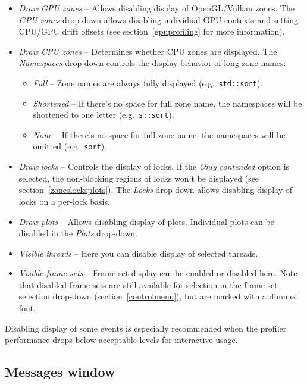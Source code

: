 \documentclass[hidelinks,titlepage,a4paper]{article}
\begin{document}
\begin{itemize}
\item \emph{\faEye{} Draw GPU zones} -- Allows disabling display of OpenGL/Vulkan zones. The \emph{GPU zones} drop-down allows disabling individual GPU contexts and setting CPU/GPU drift offsets (see section~\ref{gpuprofiling} for more information).
\item \emph{\faMicrochip{} Draw CPU zones} -- Determines whether CPU zones are displayed. The \emph{Namespaces} drop-down controls the display behavior of long zone names:
\begin{itemize}
\item \emph{Full} -- Zone names are always fully displayed (e.g.\ \texttt{std::sort}).
\item \emph{Shortened} -- If there's no space for full zone name, the namespaces will be shortened to one letter (e.g.\ \texttt{s::sort}).
\item \emph{None} -- If there's no space for full zone name, the namespaces will be omitted (e.g.\ \texttt{sort}).
\end{itemize}
\item \emph{\faLock{} Draw locks} -- Controls the display of locks. If the \emph{Only contended} option is selected, the non-blocking regions of locks won't be displayed (see section~\ref{zoneslocksplots}). The \emph{Locks} drop-down allows disabling display of locks on a per-lock basis.
\item \emph{\faSignature{} Draw plots} -- Allows disabling display of plots. Individual plots can be disabled in the \emph{Plots} drop-down.
\item \emph{\faRandom{} Visible threads} -- Here you can disable display of selected threads.
\item \emph{\faImages{} Visible frame sets} -- Frame set display can be enabled or disabled here. Note that disabled frame sets are still available for selection in the frame set selection drop-down (section~\ref{controlmenu}), but are marked with a dimmed font.
\end{itemize}

Disabling display of some events is especially recommended when the profiler performance drops below acceptable levels for interactive usage.

\subsection{Messages window}
\label{messages}
\end{document}
